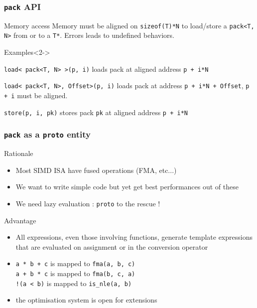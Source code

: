 \frame
{
  \frametitle{\texttt{pack} API}
	
	\begin{block}{Memory access}
\footnotesize
 Memory must be aligned on \lstinline{sizeof(T)*N} to load/store a \lstinline{pack<T, N>}
	from or to a \lstinline{T*}. Errors leads to undefined behaviors.
\end{block}{}

\begin{block}{Examples}<2->
{
\footnotesize
\lstinline{load< pack<T, N> >(p, i)} loads pack at aligned address \lstinline{p + i*N}
\begin{center}\end{center}
}

{
\footnotesize
\lstinline{load< pack<T, N>, Offset>(p, i)} loads pack at address \lstinline{p + i*N + Offset}, \lstinline{p + i} must be aligned.
\begin{center}\end{center}
}

{
\footnotesize
  \lstinline{store(p, i, pk)} stores pack \lstinline{pk} at aligned address \lstinline{p + i*N}
}
\end{block}{}
}

\frame
{
  \frametitle{\texttt{pack} as a \texttt{proto} entity}
	
	\begin{block}{Rationale}
	\begin{itemize}\footnotesize
       \item Most SIMD ISA have fused operations (FMA, etc...)
     \item We want to write simple code but yet get best performances out of these
  \item We need lazy evaluation : \texttt{proto} to the rescue !
        \end{itemize}
	\end{block}{}
	
	\begin{block}{Advantage}
	\begin{itemize}\footnotesize
		\item All expressions, even those involving functions,
		      generate template expressions that are evaluated on assignment
		      or in the conversion operator
		\item \lstinline{a * b + c} is mapped to \lstinline{fma(a, b, c)}\\
		      \lstinline{a + b * c} is mapped to \lstinline{fma(b, c, a)}\\
		      \lstinline{!(a < b)} is mapped to \lstinline{is_nle(a, b)}
   \item the optimisation system is open for extensions
	\end{itemize}
	\end{block}{}
}

